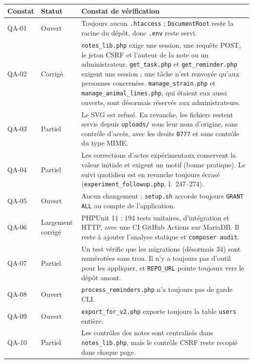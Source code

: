 \documentclass[11pt,a4paper]{article}
\newcommand{\f}[1]{\nolinkurl{#1}}
\begin{document}
\begin{center}
\begin{tabularx}{\textwidth}{@{}lp{2.1cm}X@{}}
\toprule
\textbf{Constat} & \textbf{Statut} & \textbf{Constat de vérification}\\
\midrule
QA-01 & \textcolor{crit}{Ouvert} & Toujours aucun \f{.htaccess} ; \f{DocumentRoot} reste la racine du dépôt, donc \f{.env} reste servi.\\
QA-02 & \textcolor{ok}{Corrigé} & \f{notes_lib.php} exige une session, une requête POST, le jeton CSRF et l'auteur de la note ou un administrateur. \f{get_task.php} et \f{get_reminder.php} exigent une session ; une tâche n'est renvoyée qu'aux personnes concernées. \f{manage_strain.php} et \f{manage_animal_lines.php}, qui étaient eux aussi ouverts, sont désormais réservés aux administrateurs.\\
QA-03 & \textcolor{maj}{Partiel} & Le SVG est refusé. En revanche, les fichiers restent servis depuis \f{uploads/} sous leur nom d'origine, sans contrôle d'accès, avec les droits \f{0777} et sans contrôle du type MIME.\\
QA-04 & \textcolor{maj}{Partiel} & Les corrections d'actes expérimentaux conservent la valeur initiale et exigent un motif (bonne pratique). Le suivi quotidien est en revanche toujours écrasé (\f{experiment_followup.php}, l.~247--274).\\
QA-05 & \textcolor{crit}{Ouvert} & Aucun changement ; \f{setup.sh} accorde toujours \texttt{GRANT ALL} au compte de l'application.\\
QA-06 & \textcolor{ok}{Largement corrigé} & PHPUnit 11 : 194 tests unitaires, d'intégration et HTTP, avec une CI GitHub Actions sur MariaDB. Il reste à ajouter l'analyse statique et \texttt{composer audit}.\\
QA-07 & \textcolor{maj}{Partiel} & Un test vérifie que les migrations (désormais 34) sont numérotées sans trou. Il n'y a toujours pas d'outil pour les appliquer, et \f{REPO_URL} pointe toujours vers le dépôt amont.\\
QA-08 & \textcolor{crit}{Ouvert} & \f{process_reminders.php} n'a toujours pas de garde CLI.\\
QA-09 & \textcolor{crit}{Ouvert} & \f{export_for_v2.php} exporte toujours la table \f{users} entière.\\
QA-10 & \textcolor{maj}{Partiel} & Les contrôles des notes sont centralisés dans \f{notes_lib.php}, mais le contrôle CSRF reste recopié dans chaque page.\\

\end{tabularx}
\end{center}
\end{document}
